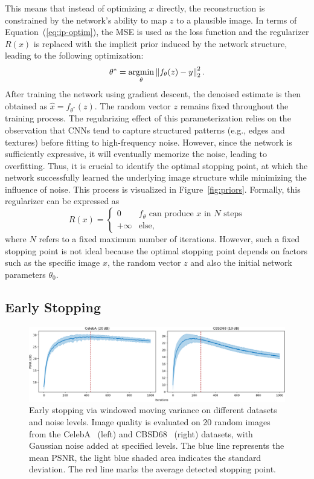 This means that instead of optimizing $x$ directly, the reconstruction is constrained by the network's ability to map $z$ to a plausible image.
In terms of Equation~(\ref{eq:ip-optim}), the MSE is used as the loss function and the regularizer $R(x)$ is replaced with the implicit prior induced by the network structure, leading to the following optimization:
\begin{equation}
    \theta^* = \operatorname*{argmin}_\theta \left\lVert f_\theta(z) - y\right\rVert_2^2.
\end{equation}
After training the network using gradient descent, the denoised estimate is then obtained as $\hat{x} = f_{\theta^*}(z)$.
The random vector $z$ remains fixed throughout the training process.
The regularizing effect of this parameterization relies on the observation that CNNs tend to capture structured patterns (e.g., edges and textures) before fitting to high-frequency noise.
However, since the network is sufficiently expressive, it will eventually memorize the noise, leading to overfitting.
Thus, it is crucial to identify the optimal stopping point, at which the network successfully learned the underlying image structure while minimizing the influence of noise.
This process is visualized in Figure~\ref{fig:priors}.
Formally, this regularizer can be expressed as
\begin{equation}
    R(x) = \begin{cases}
        0 &\text{$f_\theta$ can produce $x$ in $N$ steps}\\
        +\infty &\text{else},
    \end{cases}
\end{equation}
where $N$ refers to a fixed maximum number of iterations.
However, such a fixed stopping point is not ideal because the optimal stopping point depends on factors such as the specific image $x$, the random vector $z$ and also the initial network parameters $\theta_0$.

\subsection{Early Stopping}

\begin{figure}[t]
    \centering
    \includegraphics[width=\textwidth]{img/fig_4.2.png}
    \caption{
        Early stopping via windowed moving variance on different datasets and noise levels.
        Image quality is evaluated on 20 random images from the CelebA~\cite{CelebA} (left) and CBSD68~\cite{CBSD68} (right) datasets, with Gaussian noise added at specified levels.
        The blue line represents the mean PSNR, the light blue shaded area indicates the standard deviation.
        The red line marks the average detected stopping point.
    }\label{fig:early-stopping}
\end{figure}

